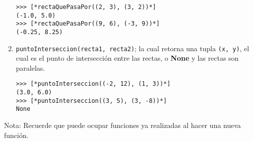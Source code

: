 \begin{enumerate}
\begin{lstlisting}[style=consola]
>>> [*rectaQuePasaPor((2, 3), (3, 2))*]
(-1.0, 5.0)
>>> [*rectaQuePasaPor((9, 6), (-3, 9))*]
(-0.25, 8.25)
\end{lstlisting}

\item \texttt{puntoInterseccion(recta1, recta2)}; la cual retorna una tupla \texttt{(x, y)}, el cual es el punto de intersección entre las rectas, o \textbf{None} y las rectas son paralelas.

\begin{lstlisting}[style=consola]
>>> [*puntoInterseccion((-2, 12), (1, 3))*]
(3.0, 6.0)
>>> [*puntoInterseccion((3, 5), (3, -8))*]
None
\end{lstlisting}


\end{enumerate}

Nota: Recuerde que puede ocupar funciones ya realizadas al hacer una nueva función.
